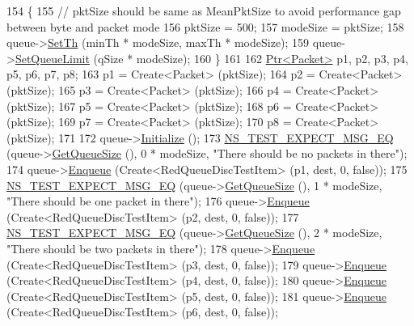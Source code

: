 \begin{DoxyCode}
154     \{
155       \textcolor{comment}{// pktSize should be same as MeanPktSize to avoid performance gap between byte and packet mode}
156       pktSize = 500;
157       modeSize = pktSize;
158       queue->\hyperlink{classns3_1_1RedQueueDisc_a1c5c1f25cda04d2b92254ff908715bdf}{SetTh} (minTh * modeSize, maxTh * modeSize);
159       queue->\hyperlink{classns3_1_1RedQueueDisc_ab5348f5a688d4dff0602654f79d87477}{SetQueueLimit} (qSize * modeSize);
160     \}
161 
162   \hyperlink{classns3_1_1Ptr}{Ptr<Packet>} p1, p2, p3, p4, p5, p6, p7, p8;
163   p1 = Create<Packet> (pktSize);
164   p2 = Create<Packet> (pktSize);
165   p3 = Create<Packet> (pktSize);
166   p4 = Create<Packet> (pktSize);
167   p5 = Create<Packet> (pktSize);
168   p6 = Create<Packet> (pktSize);
169   p7 = Create<Packet> (pktSize);
170   p8 = Create<Packet> (pktSize);
171 
172   queue->\hyperlink{classns3_1_1Object_af4411cb29971772fcd09203474a95078}{Initialize} ();
173   \hyperlink{group__testing_ga7304ba46a28d8cf08dfdfd6499cf7068}{NS\_TEST\_EXPECT\_MSG\_EQ} (queue->\hyperlink{classns3_1_1RedQueueDisc_aa201a831b85c287a99d7a5e04455b463}{GetQueueSize} (), 0 * modeSize, \textcolor{stringliteral}{"There
       should be no packets in there"});
174   queue->\hyperlink{classns3_1_1QueueDisc_af452fb01b98fed312125163f1fe85431}{Enqueue} (Create<RedQueueDiscTestItem> (p1, dest, 0, \textcolor{keyword}{false}));
175   \hyperlink{group__testing_ga7304ba46a28d8cf08dfdfd6499cf7068}{NS\_TEST\_EXPECT\_MSG\_EQ} (queue->\hyperlink{classns3_1_1RedQueueDisc_aa201a831b85c287a99d7a5e04455b463}{GetQueueSize} (), 1 * modeSize, \textcolor{stringliteral}{"There
       should be one packet in there"});
176   queue->\hyperlink{classns3_1_1QueueDisc_af452fb01b98fed312125163f1fe85431}{Enqueue} (Create<RedQueueDiscTestItem> (p2, dest, 0, \textcolor{keyword}{false}));
177   \hyperlink{group__testing_ga7304ba46a28d8cf08dfdfd6499cf7068}{NS\_TEST\_EXPECT\_MSG\_EQ} (queue->\hyperlink{classns3_1_1RedQueueDisc_aa201a831b85c287a99d7a5e04455b463}{GetQueueSize} (), 2 * modeSize, \textcolor{stringliteral}{"There
       should be two packets in there"});
178   queue->\hyperlink{classns3_1_1QueueDisc_af452fb01b98fed312125163f1fe85431}{Enqueue} (Create<RedQueueDiscTestItem> (p3, dest, 0, \textcolor{keyword}{false}));
179   queue->\hyperlink{classns3_1_1QueueDisc_af452fb01b98fed312125163f1fe85431}{Enqueue} (Create<RedQueueDiscTestItem> (p4, dest, 0, \textcolor{keyword}{false}));
180   queue->\hyperlink{classns3_1_1QueueDisc_af452fb01b98fed312125163f1fe85431}{Enqueue} (Create<RedQueueDiscTestItem> (p5, dest, 0, \textcolor{keyword}{false}));
181   queue->\hyperlink{classns3_1_1QueueDisc_af452fb01b98fed312125163f1fe85431}{Enqueue} (Create<RedQueueDiscTestItem> (p6, dest, 0, \textcolor{keyword}{false}));

\end{DoxyCode}
